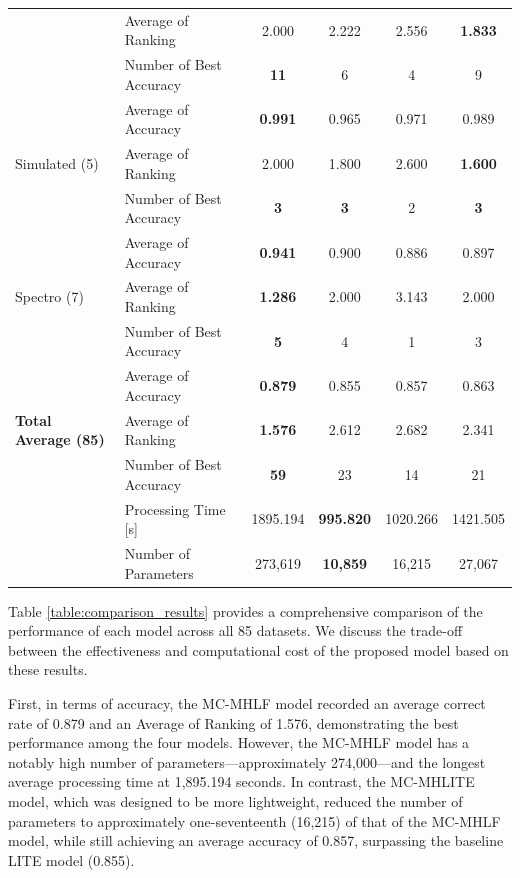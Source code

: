 \documentclass[conference]{IEEEtran}
\begin{document}
\begin{table}[tb]
{\begin{tabular}{llcccc}
      & Average of Ranking & 2.000 & 2.222 & 2.556 & \textbf{1.833} \\
      & Number of Best Accuracy & \textbf{11} & 6 & 4 & 9 \\
      \midrule
      \multirow{3}{*}{Simulated (5)} & Average of Accuracy & \textbf{0.991} & 0.965 & 0.971 & 0.989 \\
      & Average of Ranking & 2.000 & 1.800 & 2.600 & \textbf{1.600} \\
      & Number of Best Accuracy & \textbf{3} & \textbf{3} & 2 & \textbf{3} \\
      \midrule
      \multirow{3}{*}{Spectro (7)} & Average of Accuracy & \textbf{0.941} & 0.900 & 0.886 & 0.897 \\
      & Average of Ranking & \textbf{1.286} & 2.000 & 3.143 & 2.000 \\
      & Number of Best Accuracy & \textbf{5} & 4 & 1 & 3 \\
      \midrule[1pt]
      \multirow{3}{*}{\textbf{Total Average (85)}} & Average of Accuracy & \textbf{0.879} & 0.855 & 0.857 & 0.863 \\
      & Average of Ranking & \textbf{1.576} & 2.612 & 2.682 & 2.341 \\
      & Number of Best Accuracy & \textbf{59} & 23 & 14 & 21 \\
	& Processing Time [s] & 1895.194 & \textbf{995.820} & 1020.266 & 1421.505 \\
      & Number of Parameters & 273,619 & \textbf{10,859} & 16,215 & 27,067 \\
      \bottomrule
    \end{tabular}
  }
\end{table}


Table \ref{table:comparison_results} provides a comprehensive comparison of the performance of each model across all 85 datasets.  We discuss the trade-off between the effectiveness and computational cost of the proposed model based on these results.


First, in terms of accuracy, the MC-MHLF model recorded an average correct rate of 0.879 and an Average of Ranking of 1.576, demonstrating the best performance among the four models. However, the MC-MHLF model has a notably high number of parameters—approximately 274,000—and the longest average processing time at 1,895.194 seconds. In contrast, the MC-MHLITE model, which was designed to be more lightweight, reduced the number of parameters to approximately one-seventeenth (16,215) of that of the MC-MHLF model, while still achieving an average accuracy of 0.857, surpassing the baseline LITE model (0.855).
\end{document}

